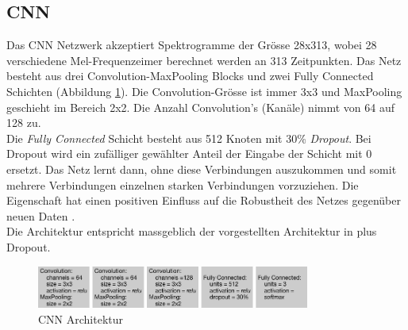 \subsection{CNN}
Das CNN Netzwerk akzeptiert Spektrogramme der Grösse 28x313, wobei 28 verschiedene Mel-Frequenzeimer berechnet werden an 313 Zeitpunkten. Das Netz besteht aus drei Convolution-MaxPooling Blocks und zwei Fully Connected Schichten (Abbildung \ref{img:cnn}). Die Convolution-Grösse ist immer 3x3 und MaxPooling geschieht im Bereich 2x2. Die Anzahl Convolution's (Kanäle) nimmt von 64 auf 128 zu. 
\\
Die \textit{Fully Connected} Schicht besteht aus 512 Knoten mit 30\% \textit{Dropout}. Bei Dropout wird ein zufälliger gewählter Anteil der Eingabe der Schicht mit 0 ersetzt. Das Netz lernt dann, ohne diese Verbindungen auszukommen und somit mehrere Verbindungen einzelnen starken Verbindungen vorzuziehen. Die Eigenschaft hat einen positiven Einfluss auf die Robustheit des Netzes gegenüber neuen Daten \parencite[][Kap. 4.4.3]{chollet}.
\\
Die Architektur entspricht massgeblich der vorgestellten Architektur in \parencite{iLID} plus Dropout.
 \begin{figure}[hbt]
	\centering
		\includegraphics[width=0.8\textwidth]{assets/cnn.png}
	\caption{CNN Architektur}
	\label{img:cnn}
\end{figure}

